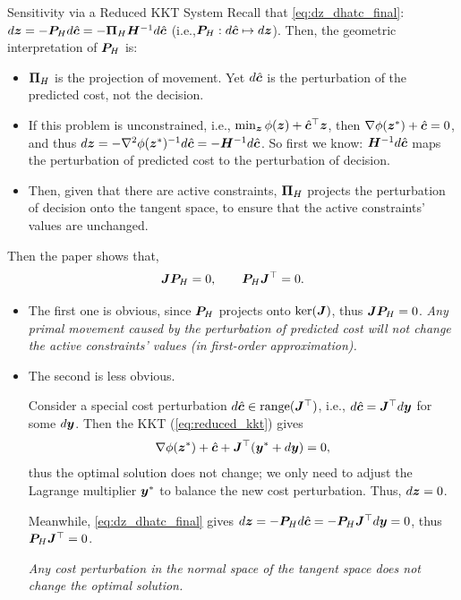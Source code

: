 \documentclass[10pt,aspectratio=169,xcolor=dvipsnames]{beamer}
\begin{document}
\begin{frame}[allowframebreaks]{Sensitivity via a Reduced KKT System}
    Recall that \eqref{eq:dz_dhatc_final}: $d{\bm{z}} = -{\bm{P}}_H d\hat{{\bm{c}}} = -{\bm{\Pi}}_H {\bm{H}}^{-1} d\hat{{\bm{c}}}$ (i.e.,${\bm{P}}_H: d\hat{{\bm{c}}} \mapsto d{\bm{z}}$). Then, the geometric interpretation of ${\bm{P}}_H$ is:
    \begin{itemize}
        \item ${\bm{\Pi}}_H$ is the projection of movement. Yet $d\hat{{\bm{c}}}$ is the perturbation of the predicted cost, not the decision.
        \item If this problem is unconstrained, i.e., $\min_{{\bm{z}}} \phi({\bm{z}}) + \hat{{\bm{c}}}^\top {\bm{z}}$, then $\nabla \phi({\bm{z}}^*) + \hat{{\bm{c}}} = 0$, and thus $d{\bm{z}} = - \nabla^2 \phi({\bm{z}}^*)^{-1} d\hat{{\bm{c}}} = -{\bm{H}}^{-1} d\hat{{\bm{c}}}$. So first we know: ${\bm{H}}^{-1} d\hat{{\bm{c}}}$ maps the perturbation of predicted cost to the perturbation of decision.
        \item Then, given that there are active constraints, ${\bm{\Pi}}_H$ projects the perturbation of decision onto the tangent space, to ensure that the active constraints' values are unchanged.
    \end{itemize}

    \break

    Then the paper shows that,
    \begin{equation}
        {{\bm{J}}{\bm{P}}_H = 0 , \qquad {\bm{P}}_H {\bm{J}}^\top = 0}.
    \end{equation}
    \begin{itemize}
        \item The first one is obvious, since ${\bm{P}}_H$ projects onto $\ker({\bm{J}})$, thus ${\bm{J}} {\bm{P}}_H = 0$. \emph{Any primal movement caused by the perturbation of predicted cost will not change the active constraints' values (in first-order approximation).}
        \item The second is less obvious.

        Consider a special cost perturbation $d\hat{{\bm{c}}} \in \operatorname{range}({\bm{J}}^\top)$, i.e., $d\hat{{\bm{c}}} = {\bm{J}}^\top d{\bm{y}}$ for some $d{\bm{y}}$. Then the KKT (\eqref{eq:reduced_kkt}) gives
        \begin{equation}\label{eq:kktabsorb}
            \nabla \phi({\bm{z}}^*) + \hat{{\bm{c}}} + {\bm{J}}^\top ({\bm{y}}^* + d{\bm{y}}) = 0,
        \end{equation}
        thus the optimal solution does not change; we only need to adjust the Lagrange multiplier ${\bm{y}}^*$ to balance the new cost perturbation. Thus, $d{\bm{z}} = 0$.

        Meanwhile, \eqref{eq:dz_dhatc_final} gives $d{\bm{z}} = -{\bm{P}}_H d\hat{{\bm{c}}} = -{\bm{P}}_H {\bm{J}}^\top d{\bm{y}} = 0$, thus ${\bm{P}}_H {\bm{J}}^\top = 0$.

        \emph{Any cost perturbation in the normal space of the tangent space does not change the optimal solution.}
    \end{itemize}


\end{frame}
\end{document}

